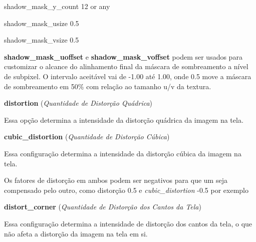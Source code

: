 \documentclass[letterpaper,10pt,brazil]{sphinxmanual}
\begin{document}
\begin{DUlineblock}{0em}
\begin{DUlineblock}{\DUlineblockindent}
\item[] shadow\_mask\_y\_count 12 or any
\item[] shadow\_mask\_usize 0.5
\item[] shadow\_mask\_vsize 0.5
\item[] 
\item[] \textbf{shadow\_mask\_uoffset} e \textbf{shadow\_mask\_voffset} podem ser usados para customizar o alcance do alinhamento final da máscara de sombreamento a nível de subpixel. O intervalo aceitável vai de -1.00 até 1.00, onde 0.5 move a máscara de sombreamento em 50\% com relação ao tamanho u/v da textura.
\item[] 
\end{DUlineblock}
\item[] \textbf{distortion} (\emph{Quantidade de Distorção Quádrica})
\item[] 
\item[]
\begin{DUlineblock}{\DUlineblockindent}
\item[] Essa opção determina a intensidade da distorção quádrica da imagem na tela.
\item[] 
\end{DUlineblock}
\item[] \textbf{cubic\_distortion} (\emph{Quantidade de Distorção Cúbica})
\item[] 
\item[]
\begin{DUlineblock}{\DUlineblockindent}
\item[] Essa configuração determina a intensidade da distorção cúbica da imagem na tela.
\item[] 
\item[] Os fatores de distorção em ambos podem ser negativos para que um seja compensado pelo outro, como distorção 0.5 e \emph{cubic\_distortion} -0.5 por exemplo
\item[] 
\end{DUlineblock}
\item[] \textbf{distort\_corner} (\emph{Quantidade de Distorção dos Cantos da Tela})
\item[] 
\item[]
\begin{DUlineblock}{\DUlineblockindent}
\item[] Essa configuração determina a intensidade de distorção dos cantos da tela, o que não afeta a distorção da imagem na tela em si.
\item[] 
\end{DUlineblock}

\end{DUlineblock}
\end{document}
